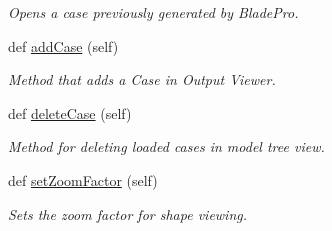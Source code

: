 \begin{DoxyCompactItemize}
\begin{DoxyCompactList}\small\item\em Opens a case previously generated by Blade\+Pro. \end{DoxyCompactList}\item 
def \hyperlink{a00078_a1a62f9b5b8f5929bdb6f0a8c27049d9e}{add\+Case} (self)
\begin{DoxyCompactList}\small\item\em Method that adds a Case in Output Viewer. \end{DoxyCompactList}\item 
def \hyperlink{a00078_a305ea5ff4997029c7a54a4550a23eba8}{delete\+Case} (self)
\begin{DoxyCompactList}\small\item\em Method for deleting loaded cases in model tree view. \end{DoxyCompactList}\item 
def \hyperlink{a00078_a2c818d907d8c5797873e1a7ad54c7d13}{set\+Zoom\+Factor} (self)
\begin{DoxyCompactList}\small\item\em Sets the zoom factor for shape viewing. \end{DoxyCompactList}\end{DoxyCompactItemize}
